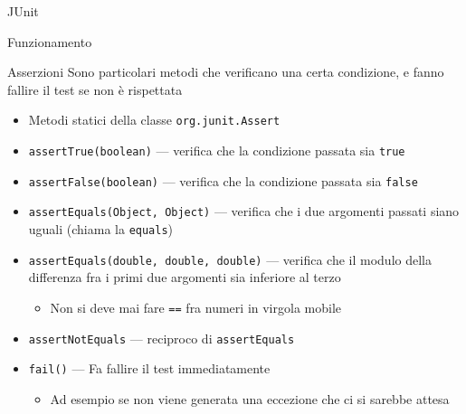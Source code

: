 \documentclass[xcolor=dvipsnames,presentation]{beamer}
\begin{document}
\begin{frame}[allowframebreaks]{JUnit}
\begin{block}{Funzionamento}
\begin{itemize}
		\end{itemize}
	\end{block}
	\begin{block}{Asserzioni}
		Sono particolari metodi che verificano una certa condizione, e fanno fallire il test se non è rispettata
		\begin{itemize}
			\item Metodi statici della classe \texttt{org.junit.Assert}
			\item \texttt{assertTrue(boolean)} --- verifica che la condizione passata sia \texttt{true}
			\item \texttt{assertFalse(boolean)} --- verifica che la condizione passata sia \texttt{false}
			\item \texttt{assertEquals(Object, Object)} --- verifica che i due argomenti passati siano uguali (chiama la \texttt{equals})
			\item \texttt{assertEquals(double, double, double)} --- verifica che il modulo della differenza fra i primi due argomenti sia inferiore al terzo
			\begin{itemize}
				\item Non si deve mai fare \texttt{==} fra numeri in virgola mobile
			\end{itemize}
			\item \texttt{assertNotEquals} --- reciproco di \texttt{assertEquals}
			\item \texttt{fail()} --- Fa fallire il test immediatamente
			\begin{itemize}
				\item Ad esempio se non viene generata una eccezione che ci si sarebbe attesa
			\end{itemize}
		\end{itemize}
	\end{block}
\end{frame}
\end{document}
